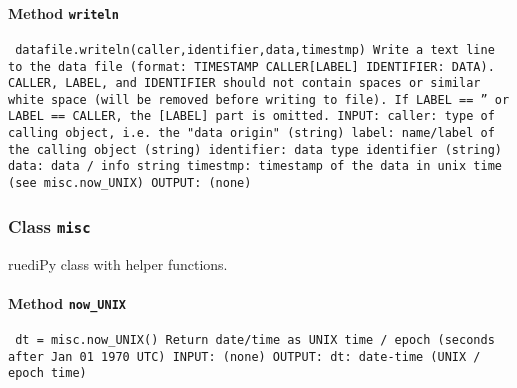 \paragraph{Method \texttt{writeln}}
\vspace{1ex}
\texttt{\newline
datafile.writeln(caller,identifier,data,timestmp)\newline
\newline
Write a text line to the data file (format: TIMESTAMP CALLER[LABEL] IDENTIFIER: DATA). CALLER, LABEL, and IDENTIFIER should not contain spaces or similar white space (will be removed before writing to file). If LABEL == '' or LABEL == CALLER, the [LABEL] part is omitted.\newline
\newline
INPUT:\newline
caller: type of calling object, i.e. the "data origin" (string)\newline
label: name/label of the calling object (string)\newline
identifier: data type identifier (string)\newline
data: data / info string\newline
timestmp: timestamp of the data in unix time (see misc.now_UNIX)\newline
\newline
OUTPUT:\newline
(none)\newline
\newline
}

\subsubsection{Class \texttt{misc}}
\par
ruediPy class with helper functions.\par

\paragraph{Method \texttt{now_UNIX}}
\vspace{1ex}
\texttt{\newline
dt = misc.now_UNIX()\newline
\newline
Return date/time as UNIX time / epoch (seconds after Jan 01 1970 UTC)\newline
\newline
INPUT:\newline
(none)\newline
\newline
OUTPUT:\newline
dt: date-time (UNIX / epoch time)\newline
\newline
}

